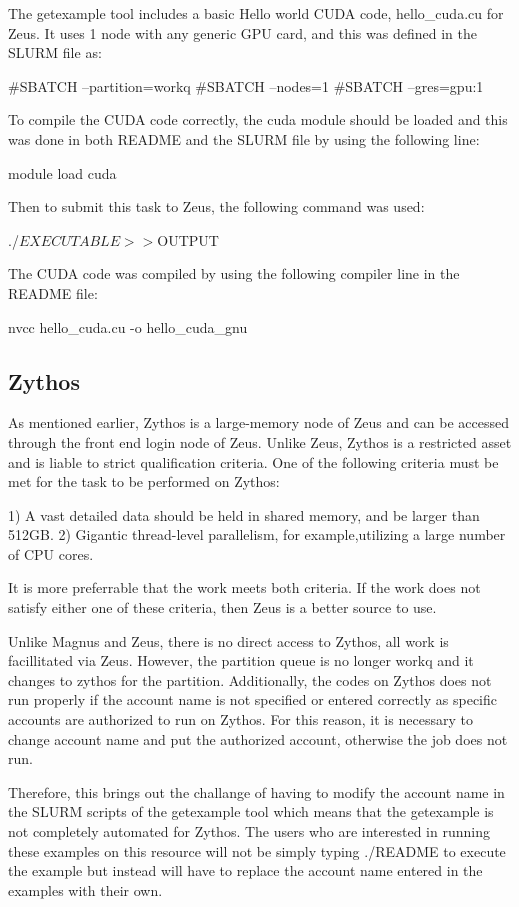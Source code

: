 \documentclass[journal]{IEEEtran}
\begin{document}
The getexample tool includes a basic Hello world CUDA code, hello_cuda.cu for Zeus. It uses 1 node with any generic GPU card, and this was defined in the 
SLURM file as:

#SBATCH --partition=workq
#SBATCH --nodes=1
#SBATCH --gres=gpu:1

To compile the CUDA code correctly, the cuda module should be loaded and this was done in both README and the SLURM file by using the following line:

module load cuda

Then to submit this task to Zeus, the following command was used:

./$EXECUTABLE >> ${OUTPUT}

The CUDA code was compiled by using the following compiler line in the README file:

nvcc hello_cuda.cu -o hello_cuda_gnu
 
  
\subsection{Zythos}

As mentioned earlier, Zythos is a large-memory node of Zeus and can be accessed through the front end login node of Zeus. Unlike Zeus, Zythos is a 
restricted asset and is liable to strict qualification criteria. One of the following criteria must be met for the task to be performed on Zythos:

1) A vast detailed data should be held in shared memory, and be larger than 512GB.
2) Gigantic thread-level parallelism, for example,utilizing a large number of CPU cores.

It is more preferrable that the work meets both criteria. If the work does not satisfy either one of these criteria, then Zeus is a better source to
use.

Unlike Magnus and Zeus, there is no direct access to Zythos, all work is facillitated via Zeus. However, the partition queue is no longer workq and it
changes to zythos for the partition. Additionally, the codes on Zythos does not run properly if the account name is not specified or entered correctly
as specific accounts are authorized to run on Zythos. For this reason, it is necessary to change account name and put the authorized account, otherwise 
the job does not run.

Therefore, this brings out the challange of having to modify the account name in the SLURM scripts of the getexample tool which means that the
getexample is not completely automated for Zythos. The users who are interested in running these examples on this resource will not be simply typing
./README to execute the example but instead will have to replace the account name entered in the examples with their own.
\end{document}
